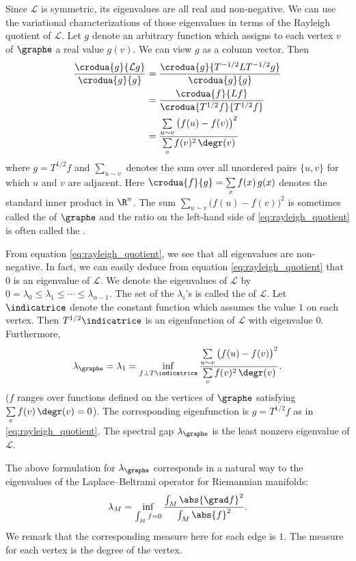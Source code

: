 Since $\mathcal{L}$ is symmetric, its eigenvalues are all real and non-negative. We can use the variational characterizations of those eigenvalues in terms of the Rayleigh quotient of $\mathcal{L}$. Let $g$ denote an arbitrary function which assigns to each vertex $v$ of $\graphe$ a real value $g(v)$. We can view $g$ as a column vector. Then
\begin{align}
    \frac{\crodua{g}{\mathcal{L}g}}{\crodua{g}{g}} &= \frac{\crodua{g}{T^{-1/2} L T^{-1/2} g}}{\crodua{g}{g}} \nonumber \\
    &= \frac{\crodua{f}{Lf}}{\crodua{T^{1/2} f}{T^{1/2} f}} \nonumber \\
    &= \frac{\sum\limits_{u \sim v} \big( f(u) - f(v) \big)^2}{\sum\limits_v f(v)^2 \, \degr(v)} \label{eq:rayleigh_quotient}
\end{align}
where $g = T^{1/2} f$ and $\sum\limits_{u \sim v}$ denotes the sum over all unordered pairs $\{u, v\}$ for which $u$ and $v$ are adjacent. Here $\crodua{f}{g} = \sum\limits_x f(x) \, g(x)$ denotes the standard inner product in $\R^n$. The sum $\sum\limits_{u \sim v} \big( f(u) - f(v) \big)^2$ is sometimes called the  of $\graphe$ and the ratio on the left-hand side of \ref{eq:rayleigh_quotient} is often called the . 

From equation \ref{eq:rayleigh_quotient}, we see that all eigenvalues are non-negative. In fact, we can easily deduce from equation \ref{eq:rayleigh_quotient} that $0$ is an eigenvalue of $\mathcal{L}$. We denote the eigenvalues of $\mathcal{L}$ by $0 = \lambda_0 \leqslant \lambda_1 \leqslant \cdots \leqslant \lambda_{n-1}$. The set of the $\lambda_i$'s is called the  of $\mathcal{L}$. Let $\indicatrice$ denote the constant function which assumes the value $1$ on each vertex. Then $T^{1/2} \indicatrice$ is an eigenfunction of $\mathcal{L}$ with eigenvalue $0$. Furthermore,
\begin{equation} \label{eq:lambdaG}
    \lambda_\graphe = \lambda_1 = \inf_{f \perp T \indicatrice} \frac{\sum\limits_{u \sim v} \big( f(u) - f(v) \big)^2}{\sum\limits_v f(v)^2 \, \degr(v)}.
\end{equation}
($f$ ranges over functions defined on the vertices of $\graphe$ satisfying $\sum\limits_v f(v) \, \degr(v) = 0$). The corresponding eigenfunction is $g = T^{1/2} f$ as in \ref{eq:rayleigh_quotient}. The spectral gap $\lambda_\graphe$ is the least nonzero eigenvalue of $\mathcal{L}$.

The above formulation for $\lambda_\graphe$ corresponds in a natural way to the eigenvalues of the Laplace--Beltrami operator for Riemannian manifolds:
\[
\lambda_M = \inf_{\int_M f = 0} \frac{\int_M \abs{\grad f}^2}{\int_M \abs{f}^2}.
\]
We remark that the corresponding measure here for each edge is $1$. The measure for each vertex is the degree of the vertex.


